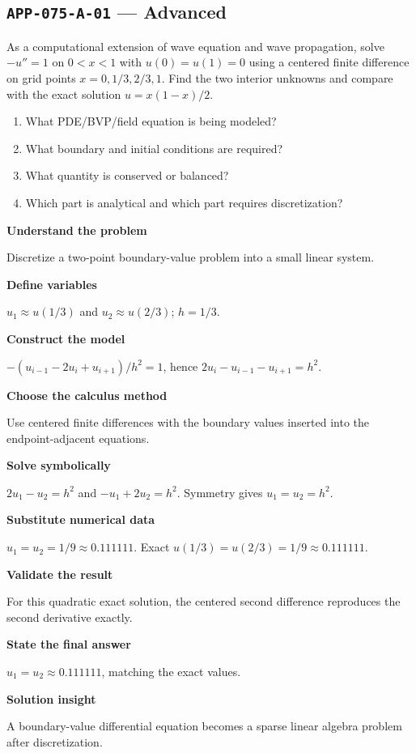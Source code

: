 \documentclass[11pt]{book}
\newcommand{\pid}[1]{\texttt{#1}}
\begin{document}
\subsection*{\pid{APP-075-A-01} — Advanced}
\begin{problembox}
As a computational extension of wave equation and wave propagation, solve $-u''=1$ on $0<x<1$ with $u(0)=u(1)=0$ using a centered finite difference on grid points $x=0,1/3,2/3,1$. Find the two interior unknowns and compare with the exact solution $u=x(1-x)/2$.
\end{problembox}
\begin{promptbox}\begin{enumerate}
\item What PDE/BVP/field equation is being modeled?
\item What boundary and initial conditions are required?
\item What quantity is conserved or balanced?
\item Which part is analytical and which part requires discretization?
\end{enumerate}\end{promptbox}
\begin{solutionbox}
\textbf{Understand the problem}\par Discretize a two-point boundary-value problem into a small linear system.\par\medskip
\textbf{Define variables}\par $u_1\approx u(1/3)$ and $u_2\approx u(2/3)$; $h=1/3$.\par\medskip
\textbf{Construct the model}\par $-(u_{i-1}-2u_i+u_{i+1})/h^2=1$, hence $2u_i-u_{i-1}-u_{i+1}=h^2$.\par\medskip
\textbf{Choose the calculus method}\par Use centered finite differences with the boundary values inserted into the endpoint-adjacent equations.\par\medskip
\textbf{Solve symbolically}\par $2u_1-u_2=h^2$ and $-u_1+2u_2=h^2$. Symmetry gives $u_1=u_2=h^2$.\par\medskip
\textbf{Substitute numerical data}\par $u_1=u_2=1/9\approx 0.111111$. Exact $u(1/3)=u(2/3)=1/9\approx 0.111111$.\par\medskip
\textbf{Validate the result}\par For this quadratic exact solution, the centered second difference reproduces the second derivative exactly.\par\medskip
\textbf{State the final answer}\par $u_1=u_2\approx 0.111111$, matching the exact values.\par\medskip
\textbf{Solution insight}\par A boundary-value differential equation becomes a sparse linear algebra problem after discretization.\par\medskip
\end{solutionbox}
\end{document}
